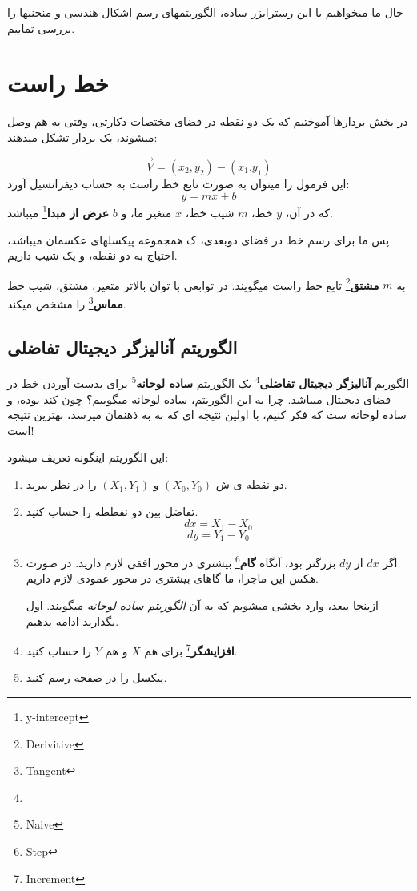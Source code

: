 \documentclass[14pt,a4paper]{memoir}
\begin{document}
	 
	 حال ما میخواهیم با این رسترایزر ساده، الگوریتمهای رسم اشکال هندسی و منحنیها را بررسی تماییم.
	 
	 \section{خط راست}\label{line} 
	
	 در بخش بردارها آموختیم که یک دو نقطه در فضای مختصات دکارتی، وقتی به هم وصل میشوند، یک بردار تشکل میدهند:
	 
	 \[ \vec{V} = \left(x_2, y_2\right) - \left(x_1. y_1\right) \]
	این فرمول را میتوان به صورت تابع خط راست به حساب دیفرانسیل آورد:
	\[ y = mx+b \]
	که در آن، $ y $ خط، $ m $ شیب خط، $ x $ متغیر ما، و $ b $   \textbf{عرض از مبدا}\footnote{y-intercept} میباشد.
	
پس ما برای رسم خط در فضای دوبعدی، ک همجموعه پیکسلهای عکسمان میباشد، احتیاج به دو نقطه، و یک شیب داریم. 

\begin{tip}
	به $ m $ \textbf{مشتق}\footnote{Derivitive} تابع خط راست میگویند. در توابعی با توان بالاتر متغیر، مشتق، شیب خط \textbf{مماس}\footnote{Tangent} را مشخص میکند.
\end{tip} 
	
	
	
	\subsection{الگوریتم آنالیزگر دیجیتال تفاضلی}\label{dda}
	الگوریم \textbf{آنالیزگر دیجیتال تفاضلی}\footnote{}  یک الگوریتم \textbf{ساده لوحانه}\footnote{Naive} برای بدست آوردن خط در فضای دیجیتال میباشد. چرا به این الگوریتم، ساده لوحانه میگوییم؟ چون کند بوده، و ساده لوحانه ست که فکر کنیم، با اولین نتیجه ای که به به ذهنمان میرسد، بهترین نتیجه است!
	
	این الگوریتم اینگونه تعریف میشود:
	
	\begin{enumerate}
		\item دو نقطه ی ش $ \left(X_0, Y_0\right) $ و $ \left(X_1, Y_1\right) $ را در نظر بیرید.
		\item تفاضل بین دو نقططه را حساب کنید.
		\[ dx = X_1 - X_0 \]
		\[ dy = Y_1 - Y_0 \]
		\item  اگر $ dx $ از $ dy $ بزرگتر بود، آنگاه \textbf{گام}\footnote{Step} بیشتری در محور افقی لازم دارید. در صورت  هکس این ماجرا، ما گاهای بیشتری در محور عمودی لازم داریم.
		
		ازینجا ببعد، وارد بخشی میشویم که به آن \textit{الگوریتم ساده لوحانه} میگویند. اول بگذارید ادامه بدهیم.
		
		\item \textbf{افزایشگر}\footnote{Increment} برای هم $ X $ و هم $ Y $ را حساب کنید.
		\item پیکسل را در صفحه رسم کنید.
		
	\end{enumerate}
	
\end{document}
